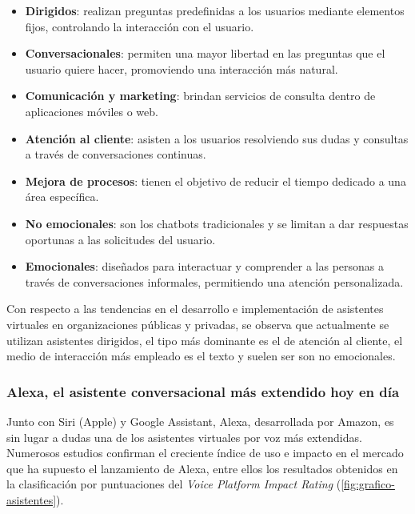 \begin{itemize}[leftmargin=1.5cm, topsep=2pt, itemsep=1pt]
    \item \textbf{Dirigidos}: realizan preguntas predefinidas a los usuarios mediante elementos fijos, controlando la interacción con el usuario.
    \item \textbf{Conversacionales}: permiten una mayor libertad en las preguntas que el usuario quiere hacer, promoviendo una interacción más natural.
    \item \textbf{Comunicación y marketing}: brindan servicios de consulta dentro de aplicaciones móviles o web.
    \item \textbf{Atención al cliente}: asisten a los usuarios resolviendo sus dudas y consultas a través de conversaciones continuas.
    \item \textbf{Mejora de procesos}: tienen el objetivo de reducir el tiempo dedicado a una área específica.
    \item \textbf{No emocionales}: son los chatbots tradicionales y se limitan a dar respuestas oportunas a las solicitudes del usuario.
    \item \textbf{Emocionales}: diseñados para interactuar y comprender a las personas a través de conversaciones informales, permitiendo una atención personalizada.
\end{itemize}

Con respecto a las tendencias en el desarrollo e implementación de asistentes virtuales en organizaciones públicas y privadas, se observa que actualmente se utilizan asistentes dirigidos, el tipo más dominante es el de atención al cliente, el medio de interacción más empleado es el texto y suelen ser son no emocionales.

\subsubsection{Alexa, el asistente conversacional más extendido hoy en día}

Junto con Siri (Apple) y Google Assistant, Alexa, desarrollada por Amazon, es sin lugar a dudas una de los asistentes virtuales por voz más extendidas. Numerosos estudios confirman el creciente índice de uso e impacto en el mercado que ha supuesto el lanzamiento de Alexa, entre ellos los resultados obtenidos en la clasificación por puntuaciones del \textit{Voice Platform Impact Rating} (\autoref{fig:grafico-asistentes}).

